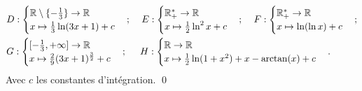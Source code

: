 \documentclass[10pt]{article}
\begin{document}
\begin{tcolorbox}[enhanced, width=7in, center, size=fbox, fontupper=\large, drop shadow southwest]
\begin{align*}
        &D:\begin{cases}\mathbb{R}\setminus\{-\frac{1}{3}\}\rightarrow\mathbb{R}\\x\mapsto\frac{1}{3}\ln(3x+1) + c\end{cases}; \hspace{0.4cm} E:\begin{cases}\mathbb{R_+^*}\rightarrow\mathbb{R}\\x\mapsto\frac{1}{2}\ln^2x + c\end{cases}; \hspace{0.4cm} F:\begin{cases}\mathbb{R_+^*}\rightarrow\mathbb{R}\\x\mapsto\ln(\ln x) + c\end{cases};\\
        &G:\begin{cases}[-\frac{1}{3}, +\infty]\rightarrow\mathbb{R}\\x\mapsto\frac{2}{9}(3x+1)^{\frac{3}{2}} + c\end{cases}; \hspace{0.5cm}H:\begin{cases}\mathbb{R}\rightarrow\mathbb{R}\\x\mapsto\frac{1}{2}\ln(1+x^2) + x - \arctan(x) + c\end{cases}.
    \end{align*}
    Avec $c$ les constantes d'intégration.
    \qed
\end{tcolorbox}

\end{document}
